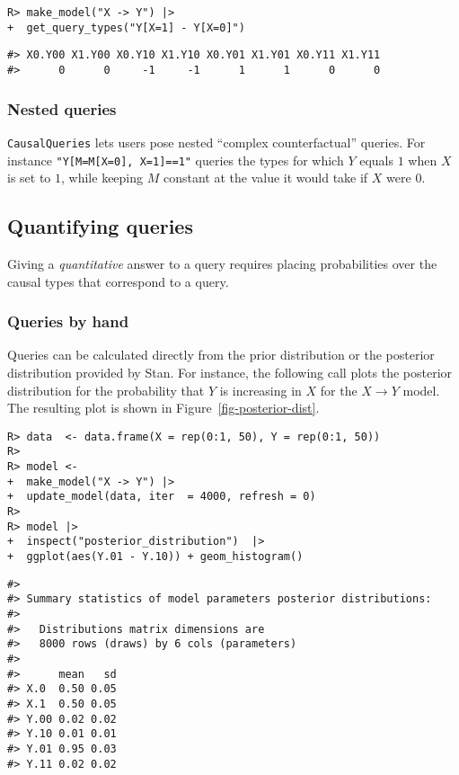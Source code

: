 \documentclass[
  11pt,
  article]{jss}
\begin{document}
\begin{verbatim}
R> make_model("X -> Y") |> 
+  get_query_types("Y[X=1] - Y[X=0]")
\end{verbatim}

\begin{verbatim}
#> X0.Y00 X1.Y00 X0.Y10 X1.Y10 X0.Y01 X1.Y01 X0.Y11 X1.Y11 
#>      0      0     -1     -1      1      1      0      0
\end{verbatim}

\subsubsection{Nested queries}\label{nested-queries}

\texttt{CausalQueries} lets users pose nested ``complex counterfactual''
queries. For instance \texttt{"Y{[}M=M{[}X=0{]},\ X=1{]}==1"} queries
the types for which \(Y\) equals \(1\) when \(X\) is set to \(1\), while
keeping \(M\) constant at the value it would take if \(X\) were \(0\).

\subsection{Quantifying queries}\label{quantifying-queries}

Giving a \emph{quantitative} answer to a query requires placing
probabilities over the causal types that correspond to a query.

\subsubsection{Queries by hand}\label{queries-by-hand}

Queries can be calculated directly from the prior distribution or the
posterior distribution provided by Stan. For instance, the following
call plots the posterior distribution for the probability that \(Y\) is
increasing in \(X\) for the \(X \rightarrow Y\) model. The resulting
plot is shown in Figure~\ref{fig-posterior-dist}.

\begin{verbatim}
R> data  <- data.frame(X = rep(0:1, 50), Y = rep(0:1, 50))
R> 
R> model <- 
+  make_model("X -> Y") |>
+  update_model(data, iter  = 4000, refresh = 0)
R> 
R> model |> 
+  inspect("posterior_distribution")  |> 
+  ggplot(aes(Y.01 - Y.10)) + geom_histogram() 
\end{verbatim}

\begin{verbatim}
#> 
#> Summary statistics of model parameters posterior distributions:
#> 
#>   Distributions matrix dimensions are 
#>   8000 rows (draws) by 6 cols (parameters)
#> 
#>      mean   sd
#> X.0  0.50 0.05
#> X.1  0.50 0.05
#> Y.00 0.02 0.02
#> Y.10 0.01 0.01
#> Y.01 0.95 0.03
#> Y.11 0.02 0.02
\end{verbatim}
\end{document}
